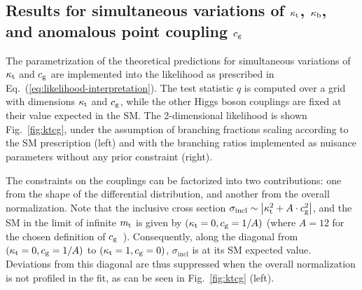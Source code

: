 \subsection{Results for simultaneous variations of \texorpdfstring{$\kappa_{\mathrm{t}}$}{kt}, \texorpdfstring{$\kappa_{\mathrm{b}}$}{kb}, and anomalous point coupling \texorpdfstring{$c_\mathrm{g}$}{cg}}
\label{sec:interpretation-results-ktcgkb}


The parametrization of the theoretical predictions for simultaneous variations of $\kappa_{\mathrm{t}}$ and $c_\mathrm{g}$ are implemented into the likelihood as prescribed in Eq.~(\ref{eq:likelihood-interpretation}).
% 
The test statistic $q$ is computed over a grid with dimensions $\kappa_{\mathrm{t}}$ and $c_\mathrm{g}$, while the other Higgs boson couplings are fixed at their value expected in the SM.
% 
The 2-dimensional likelihood is shown Fig.~\ref{fig:ktcg}, under the assumption of branching fractions scaling according to the SM prescription (left) and with the branching ratios implemented as nuisance parameters without any prior constraint (right).


The constraints on the couplings can be factorized into two contributions: one from the shape of the differential distribution, and another from the overall normalization.
% 
Note that the inclusive cross section $\sigma_\text{incl} \sim \left| \kappa_{\mathrm{t}}^2 + A \cdot c_\mathrm{g}^2 \right|$, and the SM in the limit of infinite $m_{\mathrm{t}}$ is given by $(\kappa_{\mathrm{t}}=0, c_\mathrm{g}=1/A)$ (where $A=12$ for the chosen definition of $c_\mathrm{g}$~\cite{Grazzini:2016paz}).
% 
Consequently, along the diagonal from $(\kappa_{\mathrm{t}}=0, c_\mathrm{g}=1/A)$ to $(\kappa_{\mathrm{t}}=1, c_\mathrm{g}=0)$, $\sigma_\text{incl}$ is at its SM expected value.
% 
Deviations from this diagonal are thus suppressed when the overall normalization is not profiled in the fit, as can be seen in Fig.~\ref{fig:ktcg} (left).


